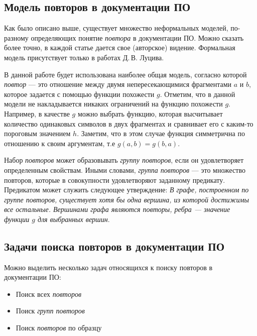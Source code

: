 \subsection{Модель повторов в документации ПО}\label{Model}
Как было описано выше, существует множество неформальных моделей, по-разному определяющих понятие \emph{повтора} в документации ПО.
Можно сказать более точно, в каждой статье дается свое (авторское) видение.
Формальная модель присутствует только в работах Д.\,В. Луцива.

В данной работе будет использована наиболее общая модель, согласно которой \emph{повтор} --- это отношение между двумя непересекающимися фрагментами $a$ и $b$, которое задается с помощью функции похожести $g$.
Отметим, что в данной модели не накладывается никаких ограничений на функцию похожести $g$.
Например, в качестве $g$ можно выбрать функцию, которая высчитывает количество одинаковых символов в двух фрагментах и сравнивает его с каким-то пороговым значением $h$. Заметим, что в этом случае функция симметрична по отношению к своим аргументам, т.е $g(a,b) = g(b,a)$.


Набор \emph{повторов} может образовывать \emph{группу повторов}, если он удовлетворяет определенным свойствам. Иными словами, \emph{группа повторов}  --- это множество повторов, которые в совокупности удовлетворяют заданному предикату.
Предикатом может служить следующее утверждение: \emph{В графе, построенном по группе повторов, существует хотя бы одна вершина, из которой достижимы все остальные. Вершинами графа являются повторы, ребра --- значение функции $g$  для выбранных вершин}.


\subsection{Задачи поиска повторов в документации ПО}

Можно выделить несколько задач относящихся к поиску повторов в документации ПО:
\begin{itemize}
    \item Поиск всех \emph{повторов}
    \item Поиск \emph{групп повторов}
    \item Поиск \emph{повторов} по образцу
\end{itemize}

